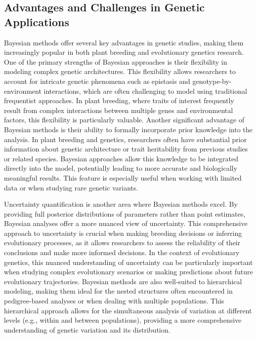 \documentclass[12pt,a4paper]{article}
\begin{document}
\subsection{Advantages and Challenges in Genetic Applications}

Bayesian methods offer several key advantages in genetic studies, making them increasingly popular in both plant breeding and evolutionary genetics research. One of the primary strengths of Bayesian approaches is their flexibility in modeling complex genetic architectures. This flexibility allows researchers to account for intricate genetic phenomena such as epistasis and genotype-by-environment interactions, which are often challenging to model using traditional frequentist approaches. In plant breeding, where traits of interest frequently result from complex interactions between multiple genes and environmental factors, this flexibility is particularly valuable. Another significant advantage of Bayesian methods is their ability to formally incorporate prior knowledge into the analysis. In plant breeding and genetics, researchers often have substantial prior information about genetic architecture or trait heritability from previous studies or related species. Bayesian approaches allow this knowledge to be integrated directly into the model, potentially leading to more accurate and biologically meaningful results. This feature is especially useful when working with limited data or when studying rare genetic variants.

Uncertainty quantification is another area where Bayesian methods excel. By providing full posterior distributions of parameters rather than point estimates, Bayesian analyses offer a more nuanced view of uncertainty. This comprehensive approach to uncertainty is crucial when making breeding decisions or inferring evolutionary processes, as it allows researchers to assess the reliability of their conclusions and make more informed decisions. In the context of evolutionary genetics, this nuanced understanding of uncertainty can be particularly important when studying complex evolutionary scenarios or making predictions about future evolutionary trajectories. Bayesian methods are also well-suited to hierarchical modeling, making them ideal for the nested structures often encountered in pedigree-based analyses or when dealing with multiple populations. This hierarchical approach allows for the simultaneous analysis of variation at different levels (e.g., within and between populations), providing a more comprehensive understanding of genetic variation and its distribution.
\end{document}
